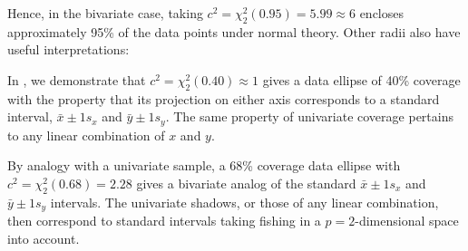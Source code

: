 Hence, in the bivariate case, taking $c^2 = \chi^2_2(0.95)= 5.99 \approx 6$ encloses approximately
95\% of the data points under normal theory.  Other radii also have useful interpretations:
\begin{itemize*}
\item In , we demonstrate that $c^2 = \chi^2_2(0.40) \approx 1$ gives
a data ellipse of 40\% coverage with the property that its projection on either axis
corresponds to a standard interval, $\bar{x} \pm 1 s_x$ and $\bar{y} \pm 1 s_y$.  The same property of univariate
coverage pertains to
any linear combination of $x$ and $y$.
\item By analogy with a univariate sample, a 68\% coverage data ellipse with
$c^2 = \chi^2_2(0.68) = 2.28$ gives a bivariate analog of the standard $\bar{x} \pm 1 s_x$ and $\bar{y} \pm 1 s_y$ intervals.
The univariate shadows, or those of any linear combination, then correspond to standard
intervals taking fishing in a $p=2$-dimensional space into account.
\end{itemize*}


